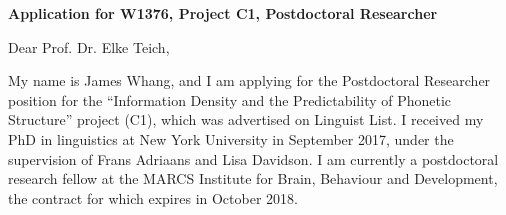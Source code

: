 \documentclass[a4paper,11pt]{article}
\begin{document}
\pagebreak
\setcounter{page}{1}

\noindent\begin{minipage}[t]{1\textwidth}
\end{minipage}

\vspace{2mm}
\noindent \textbf{Application for W1376, Project C1, Postdoctoral Researcher}

\vspace{3mm}
\noindent Dear Prof. Dr. Elke Teich,

\vspace{2mm}

\noindent My name is James Whang, and I am applying for the Postdoctoral Researcher position for the ``Information Density and the Predictability of Phonetic Structure'' project (C1), which was advertised on Linguist List. I received my PhD in linguistics at New York University in September 2017, under the supervision of Frans Adriaans and Lisa Davidson. I am currently a postdoctoral research fellow at the MARCS Institute for Brain, Behaviour and Development, the contract for which expires in October 2018.

\vspace{2mm}
\end{document}
